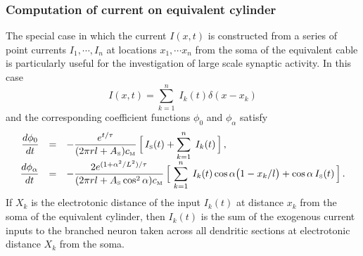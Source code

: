 \subsubsection{Computation of current on equivalent cylinder}
The special case in which the current $I(x,t)$ is constructed from
a series of point currents $I_1, \cdots,I_n$ at locations
$x_1,\cdots x_n$ from the soma of the equivalent cable is
particularly useful for the investigation of large scale synaptic
activity. In this case
\begin{equation}\label{ec1}
I(x,t)=\sum_{k=1}^n\;I_k(t)\delta(x-x_k)
\end{equation}
and the corresponding coefficient functions $\phi_0$ and
$\phi_\alpha$ satisfy
\begin{equation}\label{ec2}
\begin{array}{rcl}
\displaystyle\frac{d\phi_0}{dt} & = &\displaystyle-\frac{e^{t/\tau}}
{(2\pi r l+A_{\mbox{\tiny S}})c_{\mbox{\tiny M}}}\,\Big[\,
I_{\mbox{\tiny S}}(t)+\sum_{k=1}^n\;I_k(t)\,\Big]\,,\\[10pt]
\displaystyle\frac{d\phi_\alpha}{dt} & = & \displaystyle-\frac{2e^{(1+\alpha^2/L^2)/\tau}}
{(2\pi r l+A_{\mbox{\tiny S}}\cos^2\alpha)c_{\mbox{\tiny M}}}\,\Big[\,
\sum_{k=1}^n \;I_k(t)\cos\alpha\big(1-x_k/l\big)
+\cos\alpha\,I_{\mbox{\tiny S}}(t)\,\Big]\,.
\end{array}
\end{equation}
If $X_k$ is the electrotonic distance of the input $I_k(t)$ at
distance $x_k$ from the soma of the equivalent cylinder, then
$I_k(t)$ is the sum of the exogenous current inputs to the
branched neuron taken across all dendritic sections at
electrotonic distance $X_k$ from the soma.
